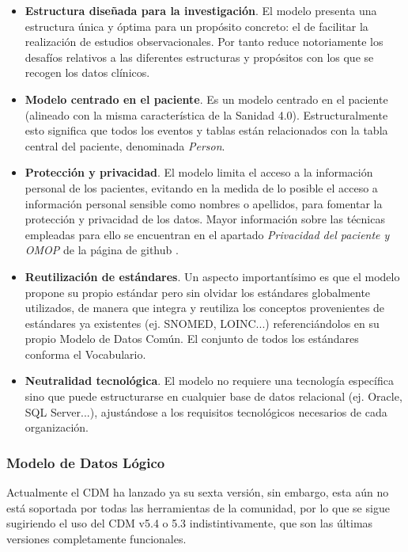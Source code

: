 \begin{itemize}
    \item \textbf{Estructura diseñada para la investigación}. 
    El modelo presenta una estructura única y óptima para un propósito concreto: el de facilitar la realización de estudios observacionales. Por tanto reduce notoriamente los desafíos relativos a las diferentes estructuras y propósitos con los que se recogen los datos clínicos.
    \item \textbf{Modelo centrado en el paciente}. Es un modelo centrado en el paciente (alineado con la misma característica de la Sanidad 4.0). Estructuralmente esto significa que todos los eventos y tablas están relacionados con la tabla central del paciente, denominada \textit{Person}. 
    \item \textbf{Protección y privacidad}. El modelo limita el acceso a la información personal de los pacientes, evitando en la medida de lo posible el acceso a información personal sensible como nombres o apellidos, para fomentar la protección y privacidad de los datos. Mayor información sobre las técnicas empleadas para ello se encuentran en el apartado \textit{Privacidad del paciente y OMOP} de la página de github \cite{gitPagesCMD}.
    \item \textbf{Reutilización de estándares}. Un aspecto importantísimo es que el modelo propone su propio estándar pero sin olvidar los estándares globalmente utilizados, de manera que integra y reutiliza los conceptos provenientes de estándares ya existentes (ej. SNOMED, LOINC...) referenciándolos en su propio Modelo de Datos Común. El conjunto de todos los estándares conforma el Vocabulario.
    \item \textbf{Neutralidad tecnológica}. El modelo no requiere una tecnología específica sino que puede estructurarse en cualquier base de datos relacional (ej. Oracle, SQL Server...), ajustándose a los requisitos tecnológicos necesarios de cada organización.
    
\end{itemize}

\subsubsection{Modelo de Datos Lógico}

Actualmente el CDM ha lanzado ya su sexta versión, sin embargo, esta aún no está soportada por todas las herramientas de la comunidad, por lo que se sigue sugiriendo el uso del CDM v5.4 o 5.3 indistintivamente, que son las últimas versiones completamente funcionales. 

